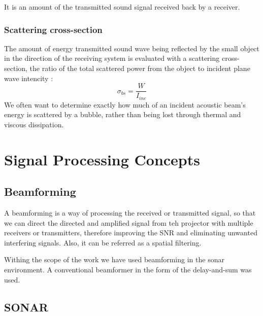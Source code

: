 It is an amount of the transmitted sound signal received back by a receiver.

\subsubsection{Scattering cross-section} 

The amount of energy transmitted sound wave being reflected by the small object in the direction of the receiving system is evaluated with a scattering cross-section, the ratio of the total scattered power from the object to incident plane wave intencity \cite[p. 40]{hodges_underwater_2011}:
\begin{equation}
    \sigma_{bs}=\frac{W}{I_{inc}}
\end{equation}
We often want to determine exactly how much of an incident acoustic beam's energy is scattered by a bubble, rather than being lost through thermal and viscous dissipation.

\section{Signal Processing Concepts}
    
\subsection{Beamforming}

A beamforming is a way of processing the received or transmitted signal, so that we can direct the directed and amplified signal from teh projector with multiple receivers or transmitters, therefore improving the SNR and eliminating unwanted interfering signals. Also, it can be referred as a spatial filtering.

Withing the scope of the work we have used beamforming in the sonar environment. A conventional beamformer in the form of the delay-and-sum was used. 

\subsection{SONAR}

